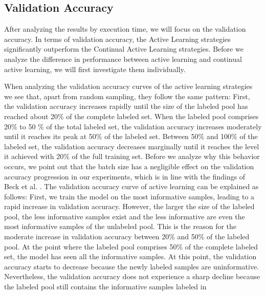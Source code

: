 \subsection{Validation Accuracy}
\label{sec:Discussion:ValidationAccuracy}
After analyzing the results by execution time, we will focus on the validation accuracy. In terms of validation accuracy, the Active Learning strategies
significantly outperform the Continual Active Learning strategies. Before we analyze the difference in performance between active learning and continual
active learning, we will first investigate them individually. \par
When analyzing the validation accuracy curves of the active learning strategies we see that, apart from random sampling, they follow the same
pattern: First, the validation accuracy increases rapidly until the size of the labeled pool has reached about 20\% of the complete labeled set. When the labeled
pool comprises 20\% to 50 \% of the total labeled set, the validation accuracy increases moderately until it reaches its peak at 50\% of the labeled set. Between
50\% and 100\% of the labeled set, the validation accuracy decreases marginally until it reaches the level it achieved with 20\% of the full training set. Before
we analyze why this behavior occurs, we point out that the batch size has a negligible effect on the validation accuracy progression in our experiments, which
is in line with the findings of Beck et al. \cite{beck2021effective}. The validation accuracy curve of active learning can be explained as follows: First, we
train the model on the most informative samples, leading to a rapid increase in validation accuracy. However, the larger the size of the labeled pool, the
less informative samples exist and the less informative are even the most informative samples of the unlabeled pool. This is the reason for the moderate
increase in validation accuracy between 20\% and 50\% of the labeled pool. At the point where the labeled pool comprises 50\% of the complete labeled set,
the model has seen all the informative samples. At this point, the validation accuracy starts to decrease because the newly labeled samples are uninformative.
Nevertheless, the validation accuracy does not experience a sharp decline because the labeled pool still contains the informative samples labeled in
